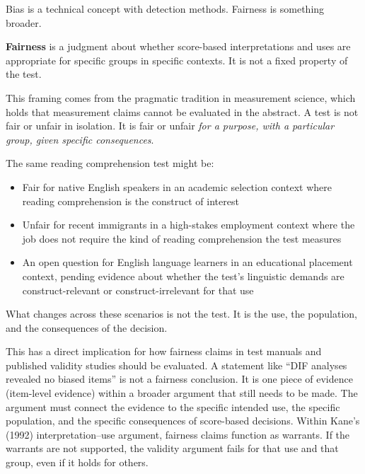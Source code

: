 \documentclass[
  11pt,
  letterpaper,
]{scrbook}
\providecommand{\tightlist}{%
  \setlength{\itemsep}{0pt}\setlength{\parskip}{0pt}}
\begin{document}
Bias is a technical concept with detection methods. Fairness is
something broader.

\begin{tcolorbox}[enhanced jigsaw, colback=white, toprule=.15mm, colbacktitle=quarto-callout-note-color!10!white, left=2mm, leftrule=.75mm, opacitybacktitle=0.6, colframe=quarto-callout-note-color-frame, rightrule=.15mm, bottomtitle=1mm, opacityback=0, titlerule=0mm, toptitle=1mm, breakable, bottomrule=.15mm, coltitle=black, title=\textcolor{quarto-callout-note-color}{\faInfo}\hspace{0.5em}{Note}, arc=.35mm]

\textbf{Fairness} is a judgment about whether score-based
interpretations and uses are appropriate for specific groups in specific
contexts. It is not a fixed property of the test.

\end{tcolorbox}

This framing comes from the pragmatic tradition in measurement science,
which holds that measurement claims cannot be evaluated in the abstract.
A test is not fair or unfair in isolation. It is fair or unfair
\emph{for a purpose, with a particular group, given specific
consequences}.

The same reading comprehension test might be:

\begin{itemize}
\tightlist
\item
  Fair for native English speakers in an academic selection context
  where reading comprehension is the construct of interest
\item
  Unfair for recent immigrants in a high-stakes employment context where
  the job does not require the kind of reading comprehension the test
  measures
\item
  An open question for English language learners in an educational
  placement context, pending evidence about whether the test's
  linguistic demands are construct-relevant or construct-irrelevant for
  that use
\end{itemize}

What changes across these scenarios is not the test. It is the use, the
population, and the consequences of the decision.

This has a direct implication for how fairness claims in test manuals
and published validity studies should be evaluated. A statement like
``DIF analyses revealed no biased items'' is not a fairness conclusion.
It is one piece of evidence (item-level evidence) within a broader
argument that still needs to be made. The argument must connect the
evidence to the specific intended use, the specific population, and the
specific consequences of score-based decisions. Within Kane's (1992)
interpretation--use argument, fairness claims function as warrants. If
the warrants are not supported, the validity argument fails for that use
and that group, even if it holds for others.
\end{document}
